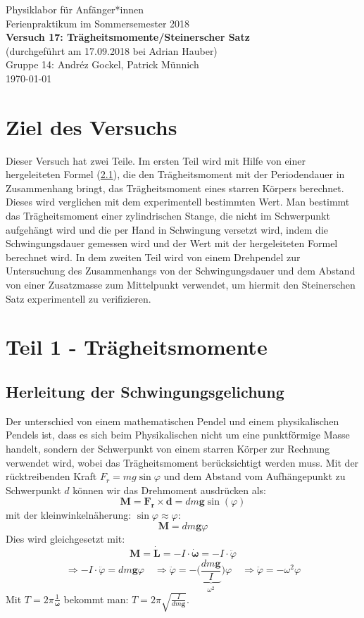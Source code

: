 \documentclass[11pt,a4paper]{article}
\renewcommand{\vec}{\boldsymbol}
\begin{document}
{
\centering 
\large 
Physiklabor für Anf\"anger*innen \\
Ferienpraktikum im Sommersemester 2018 \\[4mm]
\textbf{\LARGE 
Versuch 17: Trägheitsmomente/Steinerscher Satz
} \\[3mm]
(durchgef\"uhrt am 17.09.2018 bei Adrian Hauber)\\
Gruppe 14: Andréz Gockel, Patrick M\"unnich\\ 
\today \\[10mm]
}

\tableofcontents
\vspace{22pt}
\listoffigures
\vspace{22pt}
\listoftables
\pagebreak

\section{Ziel des Versuchs}

Dieser Versuch hat zwei Teile. Im ersten Teil wird mit Hilfe von einer hergeleiteten Formel (\ref{}), die den Trägheitsmoment mit der Periodendauer in Zusammenhang bringt, das Trägheitsmoment eines starren Körpers berechnet. Dieses wird verglichen mit dem experimentell bestimmten Wert. Man bestimmt das Trägheitsmoment einer zylindrischen Stange, die nicht im Schwerpunkt aufgehängt wird und die per Hand in Schwingung versetzt wird, indem die Schwingungsdauer gemessen wird und der Wert mit der hergeleiteten Formel berechnet wird. In dem zweiten Teil wird von einem Drehpendel zur Untersuchung des Zusammenhangs von der Schwingungsdauer und dem Abstand von einer Zusatzmasse zum Mittelpunkt verwendet, um hiermit den Steinerschen Satz experimentell zu verifizieren. 

\section{Teil 1 - Trägheitsmomente}
\subsection{Herleitung der Schwingungsgelichung}

Der unterschied von einem mathematischen Pendel und einem physikalischen Pendels ist, dass es sich beim Physikalischen nicht um eine punktförmige Masse handelt, sondern der Schwerpunkt von einem starren Körper zur Rechnung verwendet wird, wobei das Trägheitsmoment berücksichtigt werden muss. Mit der rücktreibenden Kraft $F_r = mg\sin\varphi$ und dem Abstand vom Aufhängepunkt zu Schwerpunkt $d$ können wir das Drehmoment ausdrücken als:
$$\vec{M} = \vec{F_r} \times \vec{d} = dm\vec{g}\sin(\varphi)$$
mit der kleinwinkelnäherung: $\sin\varphi \approx \varphi$:
$$\vec{M} = dm\vec{g}\varphi$$
Dies wird gleichgesetzt mit:
$$\vec{M} = \vec{\dot L} = - I \cdot \vec{\dot\omega} = - I \cdot \ddot \varphi$$
$$\Rightarrow - I \cdot \ddot \varphi = dm\vec{g}\varphi \quad \Rightarrow \ddot \varphi = - \bigg(\underbrace{\frac{dm\vec{g}}{I}}_{\omega^2}\bigg)\varphi \quad \Rightarrow \ddot \varphi = - \omega^2 \varphi$$
Mit $T = 2\pi \frac{1}{\vec{\omega}}$ bekommt man: $T = 2\pi \sqrt{\frac{I}{dm\vec{g}}}$.
\end{document}
